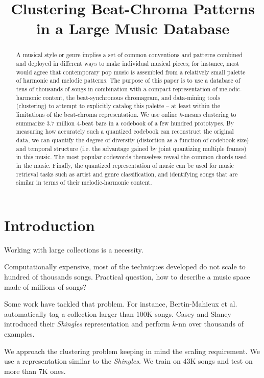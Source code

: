 \documentclass{article}
\title{Clustering Beat-Chroma Patterns in a Large Music Database}
\begin{document}
%
\maketitle
%
\begin{abstract}
A musical style or genre implies a set of common conventions
and patterns combined and deployed in different ways to make
individual musical pieces; for instance, most would agree that
contemporary pop music is assembled from a relatively small
palette of harmonic and melodic patterns.  The purpose of this
paper is to use a database of tens of thousands of songs
in combination with a compact representation of melodic-harmonic
content, the beat-synchronous chromagram, and data-mining
tools (clustering) to attempt to explicitly catalog this palette --
at least within the limitations of the beat-chroma representation.
We use online $k$-means clustering to summarize 3.7 million
4-beat bars in a codebook of a few hundred prototypes.
By measuring how accurately such a quantized codebook
can reconstruct the original data, we can quantify the degree
of diversity (distortion as a function of codebook size) and
temporal structure (i.e. the advantage gained
by joint quantizing multiple frames) in this music.  The most
popular codewords themselves reveal the common chords
used in the music.  Finally, the quantized representation of
music can be used for music retrieval tasks such as artist
and genre classification, and identifying songs that are
similar in terms of their melodic-harmonic content.
\end{abstract}
%
\section{Introduction}\label{sec:introduction}

Working with large collections is a necessity.

Computationally expensive, most of the techniques developed do not scale
to hundred of thousands songs. Practical question, how to describe a music
space made of millions of songs?

Some work have tackled that problem. For instance, Bertin-Mahieux et al.
\cite{Bertin-Mahieux2008} automatically tag a collection larger than $100$K
songs. Casey and Slaney \cite{Casey2006} introduced their \textit{Shingles}
representation and perform $k$-nn over thousands of examples.

We approach the clustering problem keeping in mind the scaling
requirement. We use a representation similar to the \textit{Shingles}.
We train on $43$K songs and test on more than $7$K ones.
\end{document}

